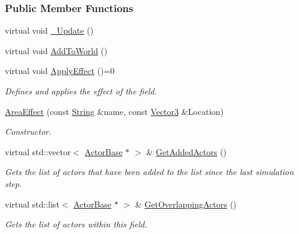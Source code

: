 \subsubsection*{Public Member Functions}
\begin{DoxyCompactItemize}
\item 
virtual void \hyperlink{classMezzanine_1_1AreaEffect_aa852e811bf900d209be137901f7e536c}{\_\-Update} ()
\item 
virtual void \hyperlink{classMezzanine_1_1AreaEffect_aed1323d5e951b5c02c789b4d30d6d9d7}{AddToWorld} ()
\item 
virtual void \hyperlink{classMezzanine_1_1AreaEffect_a988cd958e49d65331a059951af3c2884}{ApplyEffect} ()=0
\begin{DoxyCompactList}\small\item\em Defines and applies the effect of the field. \item\end{DoxyCompactList}\item 
\hyperlink{classMezzanine_1_1AreaEffect_a58cc7fb0725297113bbc32d619e57705}{AreaEffect} (const \hyperlink{namespaceMezzanine_acf9fcc130e6ebf08e3d8491aebcf1c86}{String} \&name, const \hyperlink{classMezzanine_1_1Vector3}{Vector3} \&Location)
\begin{DoxyCompactList}\small\item\em Constructor. \item\end{DoxyCompactList}\item 
virtual std::vector$<$ \hyperlink{classMezzanine_1_1ActorBase}{ActorBase} $\ast$ $>$ \& \hyperlink{classMezzanine_1_1AreaEffect_ac349f091e923cbb92740aaa35f2f5c2e}{GetAddedActors} ()
\begin{DoxyCompactList}\small\item\em Gets the list of actors that have been added to the list since the last simulation step. \item\end{DoxyCompactList}\item 
virtual std::list$<$ \hyperlink{classMezzanine_1_1ActorBase}{ActorBase} $\ast$ $>$ \& \hyperlink{classMezzanine_1_1AreaEffect_a69f19ed2d67dca2623df6e6331b31462}{GetOverlappingActors} ()
\begin{DoxyCompactList}\small\item\em Gets the list of actors within this field. \item\end{DoxyCompactList}\item 

\end{DoxyCompactItemize}
